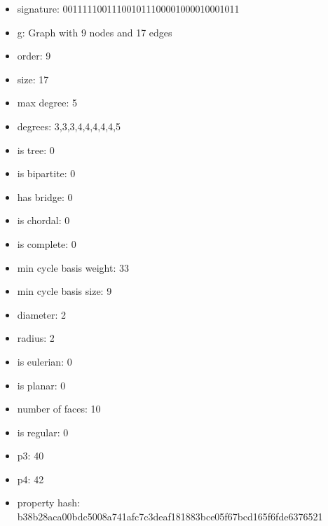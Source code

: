 \newpage
\begin{figure}
\end{figure}
\begin{itemize}
\item signature: 001111100111001011100001000010001011
\item g: Graph with 9 nodes and 17 edges
\item order: 9
\item size: 17
\item max degree: 5
\item degrees: 3,3,3,4,4,4,4,4,5
\item is tree: 0
\item is bipartite: 0
\item has bridge: 0
\item is chordal: 0
\item is complete: 0
\item min cycle basis weight: 33
\item min cycle basis size: 9
\item diameter: 2
\item radius: 2
\item is eulerian: 0
\item is planar: 0
\item number of faces: 10
\item is regular: 0
\item p3: 40
\item p4: 42
\item property hash: b38b28aca00bdc5008a741afc7c3deaf181883bce05f67bcd165f6fde6376521
\end{itemize}
